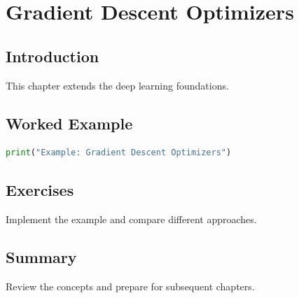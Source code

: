 \chapter{Gradient Descent Optimizers}
\label{chap:vol7-6}



\section{Introduction}
This chapter extends the deep learning foundations.

\section{Worked Example}
\begin{lstlisting}[language=Python]
print("Example: Gradient Descent Optimizers")
\end{lstlisting}

\section{Exercises}
\begin{exercise}
Implement the example and compare different approaches.
\end{exercise}

\section{Summary}
Review the concepts and prepare for subsequent chapters.
